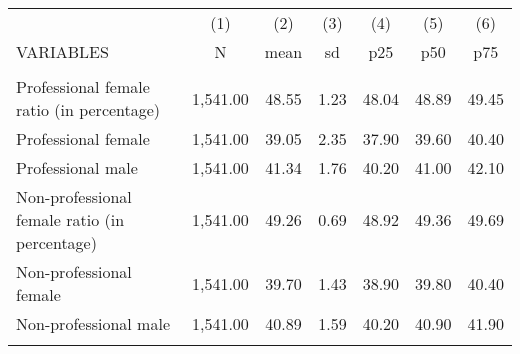 \begin{tabular}{lcccccc} \hline
 & (1) & (2) & (3) & (4) & (5) & (6) \\
VARIABLES & N & mean & sd & p25 & p50 & p75 \\ \hline
 &  &  &  &  &  &  \\
Professional female ratio (in percentage) & 1,541.00 & 48.55 & 1.23 & 48.04 & 48.89 & 49.45 \\
Professional female & 1,541.00 & 39.05 & 2.35 & 37.90 & 39.60 & 40.40 \\
Professional male & 1,541.00 & 41.34 & 1.76 & 40.20 & 41.00 & 42.10 \\
Non-professional female ratio (in percentage) & 1,541.00 & 49.26 & 0.69 & 48.92 & 49.36 & 49.69 \\
Non-professional female & 1,541.00 & 39.70 & 1.43 & 38.90 & 39.80 & 40.40 \\
Non-professional male & 1,541.00 & 40.89 & 1.59 & 40.20 & 40.90 & 41.90 \\
 &  &  &  &  &  &  \\ \hline
\end{tabular}
